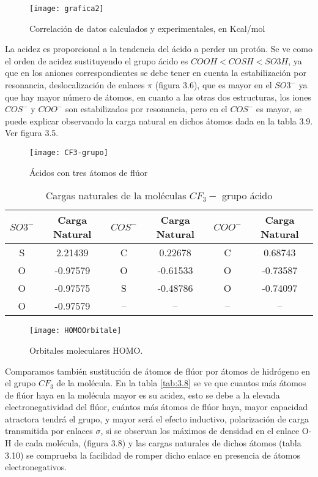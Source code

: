 \begin{figure}[H]
	\centering
	\texttt{[image: grafica2]}
	\caption {Correlación de datos calculados y experimentales, en Kcal/mol}
\end{figure}


La acidez es proporcional a la tendencia del ácido a perder un protón. Se ve como el orden de acidez sustituyendo el grupo ácido es $ COOH {<} COSH {<} SO3H $, ya que en los aniones correspondientes se debe tener en cuenta la estabilización por resonancia, deslocalización de enlaces $\pi$ (figura 3.6), que es mayor en el $SO3^-$ ya que hay mayor número de átomos, en cuanto a las otras dos estructuras, los iones $COS^-$ y $COO^-$ son estabilizados por resonancia, pero en el $COS^-$ es mayor, se puede explicar observando la carga natural en dichos átomos dada en la tabla 3.9. Ver figura 3.5.

\begin{figure}[H]
	\centering
	\texttt{[image: CF3-grupo]}
	\caption{Ácidos con tres átomos de flúor}
\end{figure}

\begin{table}[H]
    \centering
    \begin{tabular}{|c|c|c|c|c|c|}
    \hline
    $SO3^-$ & Carga Natural &$COS^-$ & Carga Natural & $COO^-$ & Carga Natural \\ \hline
    S & 2.21439 & C & 0.22678 & C & 0.68743 \\ \hline
    O & -0.97579 & O & -0.61533 & O & -0.73587 \\ \hline
    O & -0.97575 & S & -0.48786 & O & -0.74097 \\ \hline
    O & -0.97579 & -- & -- & -- & -- \\ \hline
    \end{tabular}
    \caption{Cargas naturales de la moléculas $CF_3-$ grupo ácido}
\end{table}

\begin{figure}[H]
\centering
\texttt{[image: HOMOOrbitale]}
\caption{Orbitales moleculares HOMO.}
\end{figure}

Comparamos también sustitución de átomos de flúor por átomos de hidrógeno en el grupo $CF_3$ de la molécula. En la tabla \ref{tab:3.8} se ve que cuantos más átomos de flúor haya en la molécula mayor es su acidez, esto se debe a la elevada electronegatividad del flúor, cuántos más átomos de flúor haya, mayor capacidad atractora tendrá el grupo, y mayor será el efecto inductivo, polarización de carga transmitida por enlaces $\sigma$, si se observan los máximos de densidad en el enlace O-H de cada molécula, (figura 3.8) y las cargas naturales de dichos átomos (tabla 3.10) se comprueba la facilidad de romper dicho enlace en presencia de átomos electronegativos.

